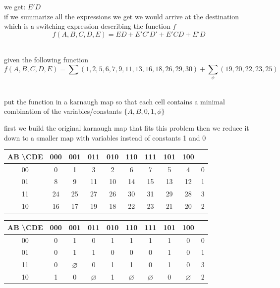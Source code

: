 \documentclass[a4paper,12pt]{article}
\begin{document}
\begin{question}
\begin{subquestion}
\begin{answer}
\begin{center}

\end{center}

we get: \(E'D\)\\[0pt]
if we summarize all the expressions we get we would arrive at the destination which is a switching expression describing the function \(f\)\\[0pt]

\[
  f(A,B,C,D,E) = ED + E'C'D' + E'CD + E'D
\]\\[0pt]
\end{answer}
\end{subquestion}
\end{question}
\begin{question}
given the following function\\[0pt]
\[
  f(A,B,C,D,E) = \sum(1,2,5,6,7,9,11,13,16,18,26,29,30) + {\sum}_\phi(19,20,22,23,25)
\]\\[0pt]
\begin{subquestion}
put the function in a karnaugh map so that each cell contains a minimal combination of the variables/constants \(\{A,B,0,1,\phi\}\)\\[0pt]
\begin{answer}
\begin{center}

\end{center}

first we build the original karnaugh map that fits this problem then we reduce it down to a smaller map with variables instead of constants 1 and 0\\[0pt]

\begin{tabular}{c|cccccccc|c}
  AB \textbackslash CDE & 000 & 001 & 011 & 010 & 110 & 111 & 101 & 100\\
  \hline
  00 & 0 & 1 & 3 & 2 & 6 & 7 & 5 & 4 & 0\\
  01 & 8 & 9 & 11& 10& 14& 15& 13& 12& 1\\
  11 & 24& 25& 27& 26& 30& 31& 29& 28& 3\\
  10 & 16& 17& 19& 18& 22& 23& 21& 20& 2\\
\end{tabular}

\begin{tabular}{c|cccccccc|c}
  AB \textbackslash CDE & 000 & 001 & 011 & 010 & 110 & 111 & 101 & 100\\
  \hline
  00 & 0 & 1    & 0    & 1 & 1    & 1    & 1 & 0    & 0\\
  01 & 0 & 1    & 1    & 0 & 0    & 0    & 1 & 0    & 1\\
  11 & 0 & $\varnothing$ & 0    & 1 & 1    & 0    & 1 & 0    & 3\\
  10 & 1 & 0    & $\varnothing$ & 1 & $\varnothing$ & $\varnothing$ & 0 & $\varnothing$ & 2
\end{tabular}


\end{answer}
\end{subquestion}
\end{question}
\end{document}
